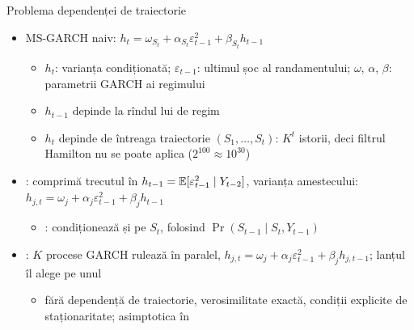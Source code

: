 \begin{frame}{Problema dependenței de traiectorie}
\itemsize{\small}
\begin{itemize}
    \item MS-GARCH naiv: $h_t = \omega_{S_t} + \alpha_{S_t}\varepsilon_{t-1}^2 + \beta_{S_t}h_{t-1}$
    \begin{itemize}
        \item $h_t$: varianța condiționată; $\varepsilon_{t-1}$: ultimul șoc al randamentului; $\omega$, $\alpha$, $\beta$: parametrii GARCH ai regimului
        \item $h_{t-1}$ depinde la rîndul lui de regim
        \item $h_t$ depinde de întreaga traiectorie $(S_1, \dots, S_t)$: $K^t$ istorii, deci filtrul Hamilton nu se poate aplica ($2^{100} \approx 10^{30}$)
    \end{itemize}
    \item {}: comprimă trecutul în $h_{t-1} = \mathbb{E}[\varepsilon_{t-1}^2 \mid Y_{t-2}]$, varianța amestecului: $h_{j,t} = \omega_j + \alpha_j\varepsilon_{t-1}^2 + \beta_j h_{t-1}$
    \begin{itemize}
        \item {}: condiționează și pe $S_t$, folosind $\Pr(S_{t-1} \mid S_t, Y_{t-1})$
    \end{itemize}
    \item {}: $K$ procese GARCH rulează în paralel, $h_{j,t} = \omega_j + \alpha_j\varepsilon_{t-1}^2 + \beta_j h_{j,t-1}$; lanțul îl alege pe unul
    \begin{itemize}
        \item fără dependență de traiectorie, verosimilitate exactă, condiții explicite de staționaritate; asimptotica în 
    \end{itemize}
\end{itemize}
\end{frame}

